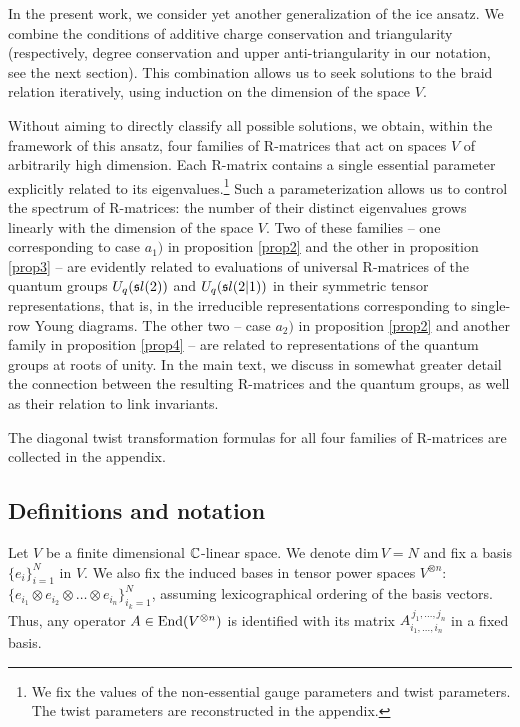 \documentclass[11pt]{article}
\begin{document}
In the present work, we consider yet another generalization of the ice ansatz. We combine the conditions of  additive charge conservation \cite{HMR} and triangularity \cite{H3} (respectively, degree conservation and  upper anti-triangularity in our notation, see the next section).
This combination allows us to seek solutions to the braid relation iteratively, using induction on the dimension of the space $V$.  

Without aiming to directly classify all possible solutions, we obtain, within the framework of this ansatz, four families of R-matrices that act on spaces $V$ of arbitrarily high dimension. Each R-matrix contains  a single essential parameter explicitly related to its eigenvalues.\footnote{We fix the values of the non-essential gauge parameters and twist parameters. The twist parameters are reconstructed in the appendix.} Such a parameterization allows us to control the spectrum of R-matrices: the number of their distinct eigenvalues grows linearly with the dimension of the space $V$.  Two of these families -- one corresponding to   case $a_1)$ in proposition \ref{prop2}  and the other in proposition \ref{prop3} -- are evidently related to evaluations of universal R-matrices of the quantum groups $U_q({\frak sl}(2))$ and $U_q({\frak sl}(2|1))$ in their symmetric tensor representations,  that is, in the irreducible representations corresponding to single-row Young diagrams. The other two --  case $a_2)$ in proposition \ref{prop2} and another family in proposition \ref{prop4} -- are related to representations of the quantum groups at  roots of unity. In the main text, we discuss in somewhat greater detail the connection between the resulting R-matrices and the quantum groups, as well as  their relation to link invariants. 



The diagonal twist transformation formulas for all four families of R-matrices are collected in the appendix.

\subsection{Definitions and notation}

Let $V$ be a finite dimensional $\Bbb C$-linear space. We denote $\mbox{dim}\, V=N$ and fix
a basis $\{e_i\}_{i=1}^{N}$ in $V$. We also fix the induced bases in tensor power spaces $V^{\otimes n}$:
$\{e_{i_1}\otimes e_{i_2}\otimes \ldots \otimes e_{i_n}\}_{i_k=1}^{N}$,
assuming lexicographical ordering of the basis vectors. Thus, any operator $A\in {\rm End}(V^{\otimes n})$ is identified with its matrix 
$A_{i_1,\ldots ,i_n}^{\,j_1,\ldots ,j_n}$ in a fixed basis.
\end{document}
